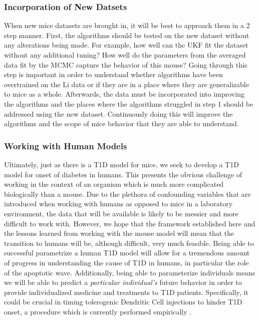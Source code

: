 \subsubsection{Incorporation of New Datsets}
When new mice datasets are brought in, it will be best to approach them in a 2 step manner. First, the algorithms should be tested on the new dataset without any alterations being made. For example, how well can the UKF fit the dataset without any additional tuning? How well do the parameters from the averaged data fit by the MCMC capture the behavior of this mouse? Going through this step is important in order to understand whether algorithms have been overtrained on the Li data or if they are in a place where they are generalizable to mice as a whole. Afterwards, the data must be incorporated into improving the algorithms and the places where the algorithms struggled in step 1 should be addressed using the new dataset. Continuously doing this will improve the algorithms and the scope of mice behavior that they are able to understand.

\subsubsection{Working with Human Models}
Ultimately, just as there is a T1D model for mice, we seek to develop a T1D model for onset of diabetes in humans. This presents the obvious challenge of working in the context of an organism which is much more complicated biologically than a mouse. Due to the plethora of confounding variables that are introduced when working with humans as opposed to mice in a laboratory environment, the data that will be available is likely to be messier and more difficult to work with. However, we hope that the framework established here and the lessons learned from working with the mouse model will mean that the transition to humans will be, although difficult, very much feasible. Being able to successful parametrize a human T1D model will allow for a tremendous amount of progress in understanding the cause of T1D in humans, in particular the role of the apoptotic wave. Additionally, being able to parameterize individuals means we will be able to predict a \emph{particular individual's} future behavior in order to provide individualized medicine and treatments to T1D patients. Specifically, it could be crucial in timing tolerogenic Dendritic Cell injections to hinder T1D onset, a procedure which is currently performed empirically \cite{shtylla2019mathematical}.





